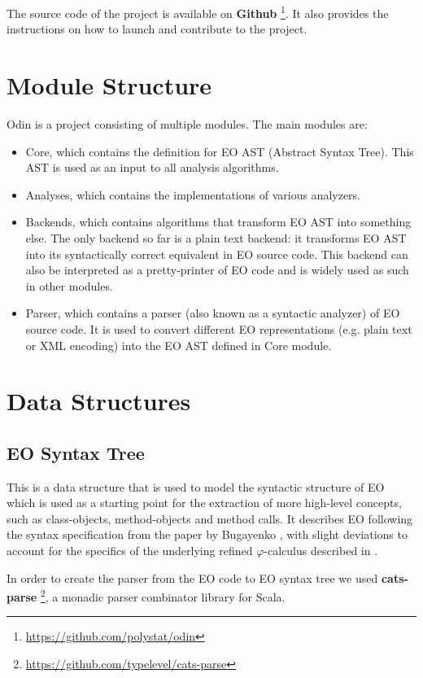 The source code of the project is available on \textbf{Github} \footnote{\url{https://github.com/polystat/odin}}. It also provides the instructions on how to launch and contribute to the project.



\section{Module Structure}
Odin is a project consisting of multiple modules. The main modules are:
\begin{itemize}
    \item Core, which contains the definition for EO AST (Abstract Syntax Tree).
          This AST is used as an input to all analysis algorithms.
    \item Analyses, which contains the implementations of various analyzers.
    \item Backends, which contains algorithms that transform EO AST into something else. The only backend so far is a plain text backend: it transforms EO AST into its syntactically correct equivalent in EO source code. This backend can also be interpreted as a pretty-printer of EO code and is widely used as such in other modules.
    \item Parser, which contains a parser (also known as a syntactic analyzer) of EO source code. It is used to convert different EO representations (e.g. plain text or XML encoding) into the EO AST defined in Core module.
\end{itemize}

\section{Data Structures}
\subsection{EO Syntax Tree}
This is a data structure that is used to model the syntactic structure of EO which is used as a starting point for the extraction of more high-level concepts, such as class-objects, method-objects and method calls. It describes EO following the syntax specification from the paper by Bugayenko \cite{eolang}, with slight deviations to account for the specifics of the underlying refined $\varphi$-calculus described in \cite{kudasov}. 

In order to create the parser from the EO code to EO syntax tree we used \textbf{cats-parse} \footnote{\url{https://github.com/typelevel/cats-parse}}, a monadic parser combinator \cite{hill_combinators_1996}  library for Scala.

